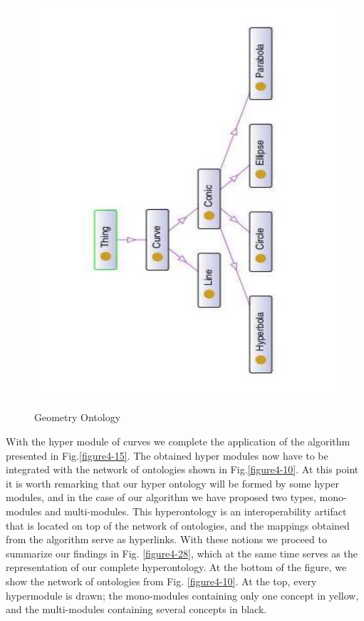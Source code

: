 \begin{figure}
\begin{center}
	\includegraphics[scale=0.5, angle=270]{figure-chapterIV/fig4-27}\\
	\vspace{-20}
	\caption{Geometry Ontology}
	\label{figure4-27}
\end{center}
\end{figure}




With the hyper module of curves we complete the application of the algorithm presented in Fig.\ref{figure4-15}. The obtained hyper modules now have to be integrated with the network of ontologies shown in Fig.\ref{figure4-10}. At this point it is worth remarking that our hyper ontology will be formed by some hyper modules, and in the case of our algorithm we have proposed two types, mono-modules and multi-modules. This hyperontology is an interoperability artifact that is located on top of the network of ontologies, and the mappings obtained from the algorithm serve as hyperlinks. With these notions we proceed to summarize our findings in Fig. \ref{figure4-28}, which at the same time serves as the representation of our complete hyperontology. At the bottom of the figure, we show the network of ontologies from Fig. \ref{figure4-10}. At the top, every hypermodule is drawn; the mono-modules containing only one concept in yellow, and the multi-modules containing several concepts in black. 


